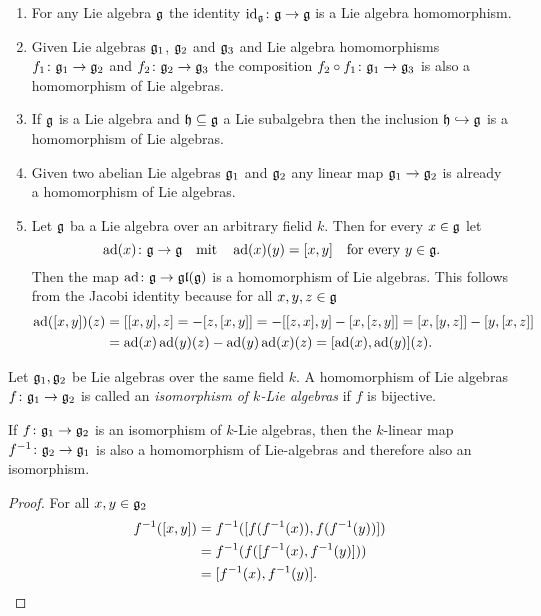 \begin{expls}\label{expls: homomorphisms of Lie algebras}
 \begin{enumerate}[leftmargin=*]
  \item
   For any Lie algebra $\mathfrak{g}$ the identity $\operatorname{id}_{\mathfrak{g}} \colon \mathfrak{g} \to \mathfrak{g}$ is a Lie algebra homomorphism.
  \item
   Given Lie algebras $\mathfrak{g}_1$, $\mathfrak{g}_2$ and $\mathfrak{g}_3$ and Lie algebra homomorphisms $f_1 \colon \mathfrak{g}_1 \to \mathfrak{g}_2$ and $f_2 \colon \mathfrak{g}_2 \to \mathfrak{g}_3$ the composition $f_2 \circ f_1 \colon \mathfrak{g}_1 \to \mathfrak{g}_3$ is also a homomorphism of Lie algebras.
  \item
   If $\mathfrak{g}$ is a Lie algebra and $\mathfrak{h} \subseteq \mathfrak{g}$ a Lie subalgebra then the inclusion $\mathfrak{h} \hookrightarrow \mathfrak{g}$ is a homomorphism of Lie algebras.
  \item
   Given two abelian Lie algebras $\mathfrak{g}_1$ and $\mathfrak{g}_2$ any linear map $\mathfrak{g}_1 \to \mathfrak{g}_2$ is already a homomorphism of Lie algebras.
  \item
   Let $\mathfrak{g}$ ba a Lie algebra over an arbitrary fielid $k$. Then for every $x \in \mathfrak{g}$ let
   \[
    \operatorname{ad}(x) \colon \mathfrak{g} \to \mathfrak{g} \quad \text{mit} \quad \operatorname{ad}(x)(y) = [x,y]
    \quad \text{for every $y \in \mathfrak{g}$}.
   \]
   Then the map $\operatorname{ad} \colon \mathfrak{g} \to \mathfrak{gl}(\mathfrak{g})$ is a homomorphism of Lie algebras. This follows from the Jacobi identity because for all $x,y,z \in \mathfrak{g}$
   \begin{align*}
    \operatorname{ad}([x,y])(z)
    &= [[x,y],z]
    = -[z,[x,y]]
    = -[[z,x],y] -[x,[z,y]]
    = [x,[y,z]] - [y,[x,z]] \\
    &= \operatorname{ad}(x)\operatorname{ad}(y)(z) - \operatorname{ad}(y)\operatorname{ad}(x)(z)
    = [\operatorname{ad}(x),\operatorname{ad}(y)](z).
   \end{align*}
 \end{enumerate}
\end{expls}


\begin{defi}
 Let $\mathfrak{g}_1, \mathfrak{g}_2$ be Lie algebras over the same field $k$. A homomorphism of Lie algebras $f \colon \mathfrak{g}_1 \to \mathfrak{g}_2$ is called an \emph{isomorphism of $k$-Lie algebras} if $f$ is bijective.
\end{defi}


\begin{lem}
 If $f \colon \mathfrak{g}_1 \to \mathfrak{g}_2$ is an isomorphism of $k$-Lie algebras, then the $k$-linear map $f^{-1} \colon \mathfrak{g}_2 \to \mathfrak{g}_1$ is also a homomorphism of Lie-algebras and therefore also an isomorphism.
\end{lem}
\begin{proof}
 For all $x,y \in \mathfrak{g}_2$
 \begin{align*}
  f^{-1}( [x,y] )
  &= f^{-1}( [ f(f^{-1}(x)), f(f^{-1}(y)) ] ) \\
  &= f^{-1}(f( [f^{-1}(x) , f^{-1}(y)] )) \\
  &= [f^{-1}(x), f^{-1}(y)].
 \qedhere
 \end{align*}
\end{proof}


